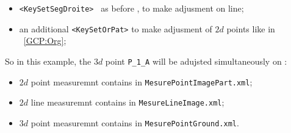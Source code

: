 \begin{itemize}
   \item  {\tt <KeySetSegDroite> } as before , to make adjusment on line;
   \item an additional {\tt  <KeySetOrPat>} to make adjusment of $2d$ points like in  ~\ref{GCP:Org};
   
\end{itemize}

So in this example, the $3d$ point {\tt P\_1\_A} will be adujsted simultaneously on :

\begin{itemize}
    \item $2d$ point measuremnt contains in {\tt MesurePointImagePart.xml};
    \item $2d$ line measuremnt contains in {\tt MesureLineImage.xml};
    \item $3d$ point measuremnt contains in {\tt MesurePointGround.xml}.
\end{itemize}

 






















